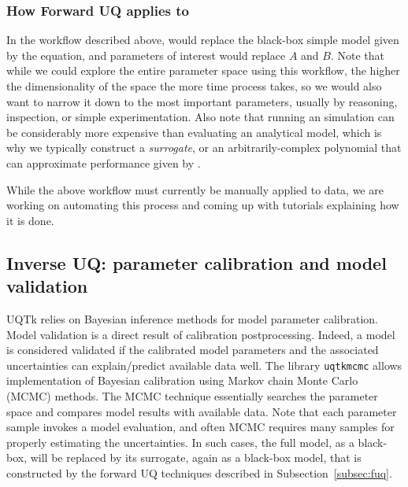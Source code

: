 \subsubsection{How Forward UQ applies to \sstmacro}

In the workflow described above, \sstmacro would replace the black-box simple model given by the equation, and \sstmacro parameters of interest would replace $A$ and $B$.   Note that while
we could explore the entire \sstmacro parameter space using this workflow, the higher the dimensionality of the space the more time process takes, so we would also want to narrow it down to the most important parameters, usually by reasoning, inspection, or simple experimentation.  
Also note that running an \sstmacro simulation can be considerably more expensive than evaluating an
analytical model, which is why we typically construct a \textit{surrogate}, or an arbitrarily-complex polynomial that can approximate performance given by \sstmacro. 

While the above workflow must currently be manually applied to \sstmacro data, we are working on automating this process and coming up with tutorials explaining how it is done.

\subsection{Inverse UQ: parameter calibration and model validation}
\label{subsec:iuq}

UQTk relies on Bayesian inference methods for model parameter calibration. Model validation is a direct result of calibration 
postprocessing. Indeed, a model is considered validated if the calibrated model parameters and the associated uncertainties can explain/predict available data well. 
The library \texttt{uqtkmcmc} allows implementation of Bayesian calibration using Markov chain Monte Carlo (MCMC) methods. The MCMC technique essentially 
searches the parameter space and compares model results with available data. Note that each parameter sample invokes a model evaluation, and often MCMC requires 
many samples for properly estimating the uncertainties. In such cases, the full model, as a black-box, will be replaced by its surrogate, again as a black-box model, that is constructed by the forward UQ techniques described in Subsection~\ref{subsec:fuq}.
